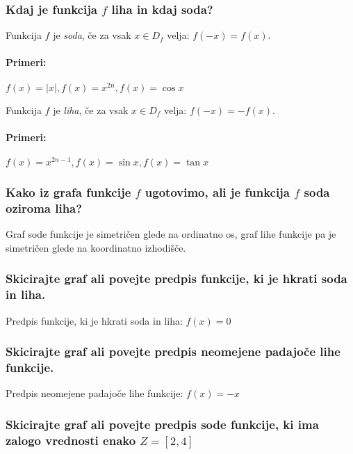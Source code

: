 \documentclass{article}
\begin{document}
\subsubsection*{Kdaj je funkcija $f$ liha in kdaj soda?}

Funkcija $f$ je \emph{soda}, če za vsak $x \in D_{f}$ velja: $f(-x)=f(x)$.

\paragraph{Primeri:} $f(x)=|x|, f(x)=x^{2 n}, f(x)=\cos x$

\vspace{3mm}
Funkcija $f$ je \emph{liha}, če za vsak $x \in D_{f}$ velja: $f(-x)=-f(x)$.

\paragraph{Primeri:} $f(x)=x^{2 n-1}, f(x)=\sin x, f(x)=\tan x$

\subsubsection*{Kako iz grafa funkcije $f$ ugotovimo, ali je funkcija $f$ soda oziroma liha?}

Graf sode funkcije je simetričen glede na ordinatno os, graf lihe funkcije pa je simetričen glede na koordinatno izhodišče.

\subsubsection*{Skicirajte graf ali povejte predpis funkcije, ki je hkrati soda in liha.}

Predpis funkcije, ki je hkrati soda in liha: $f(x)=0$

\subsubsection*{Skicirajte graf ali povejte predpis neomejene padajoče lihe funkcije.}

Predpis neomejene padajoče lihe funkcije: $f(x)=-x$


\subsubsection*{Skicirajte graf ali povejte predpis sode funkcije, ki ima zalogo vrednosti enako $Z=[2,4]$}
\end{document}

